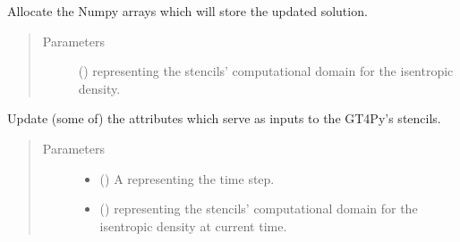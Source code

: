 \documentclass[letterpaper,10pt,english]{sphinxmanual}
\begin{document}
\begin{fulllineitems}

\begin{fulllineitems}
\label{\detokenize{api:dycore.prognostic_isentropic.PrognosticIsentropic._allocate_outputs}}
Allocate the Numpy arrays which will store the updated solution.
\begin{quote}\begin{description}
\item[{Parameters}] \leavevmode
{} () \textendash{}  representing the stencils’ computational domain for the isentropic density.

\end{description}\end{quote}

\end{fulllineitems}


\begin{fulllineitems}
\label{\detokenize{api:dycore.prognostic_isentropic.PrognosticIsentropic._set_inputs}}
Update (some of) the attributes which serve as inputs to the GT4Py’s stencils.
\begin{quote}\begin{description}
\item[{Parameters}] \leavevmode\begin{itemize}
\item {} 
 () \textendash{} A  representing the time step.

\item {} 
 () \textendash{}  representing the stencils’ computational domain for the isentropic density
at current time.


\end{itemize}
\end{description}
\end{quote}
\end{fulllineitems}
\end{fulllineitems}
\end{document}
